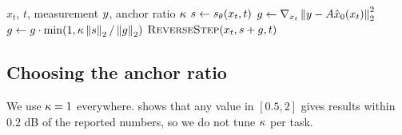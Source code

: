 \begin{algorithm}[t]
\caption{One anchored reverse step}
\label{alg:anchored}
\begin{algorithmic}[1]
\Require $x_t$, $t$, measurement $y$, anchor ratio $\kappa$
\State $s \gets s_\theta(x_t, t)$
\State $g \gets \nabla_{x_t} \left\lVert y - A \hat{x}_0(x_t) \right\rVert_2^2$
\State $g \gets g \cdot \min(1, \kappa \left\lVert s \right\rVert_2 / \left\lVert g \right\rVert_2)$
\State \Return $\textsc{ReverseStep}(x_t, s + g, t)$
\end{algorithmic}
\end{algorithm}

\subsection{Choosing the anchor ratio}
\label{sec:choosing-kappa}
We use $\kappa = 1$ everywhere.  shows that any value in $[0.5, 2]$ gives results within 0.2 dB of the reported numbers, so we do not tune $\kappa$ per task.
